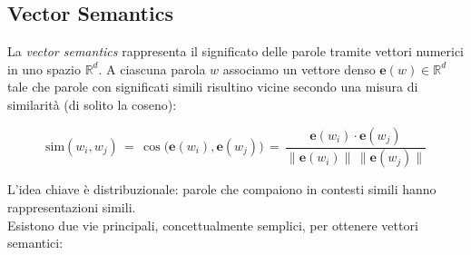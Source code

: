     \subsection{Vector Semantics}
    
        La \emph{vector semantics} rappresenta il significato delle parole tramite vettori numerici in uno spazio $\mathbb{R}^d$. A ciascuna parola $w$ associamo un vettore denso $\mathbf{e}(w)\in\mathbb{R}^d$ tale che parole con significati simili risultino vicine secondo una misura di similarità (di solito la coseno):
        
        $$
        \mathrm{sim}(w_i,w_j) \,=\, \cos\!\big(\mathbf{e}(w_i),\mathbf{e}(w_j)\big) \,=\, \frac{\mathbf{e}(w_i)\cdot\mathbf{e}(w_j)}{\lVert\mathbf{e}(w_i)\rVert\,\lVert\mathbf{e}(w_j)\rVert}
        $$
        
        L'idea chiave è distribuzionale: parole che compaiono in contesti simili hanno rappresentazioni simili.\\
        
        \noindent Esistono due vie principali, concettualmente semplici, per ottenere vettori semantici:


